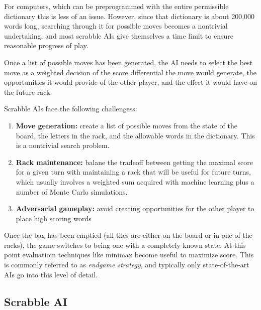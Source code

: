 \documentclass[12pt]{article}
\begin{document}
For computers, which can be preprogrammed with the entire permissible
dictionary this is less of an issue. However, since that dictionary is
about 200,000 words long, searching through it for possible moves
becomes a nontrivial undertaking, and most scrabble AIs give
themselves a time limit to ensure reasonable progress of play.

Once a list of possible moves has been generated, the AI needs to select
the best move as a weighted decision of the score differential the
move would generate, the opportunities it would provide of the other
player, and the effect it would have on the future rack.

Scrabble AIs face the following challengess:

\begin{enumerate}
  \item \textbf{Move generation:} create a list of possible moves from
    the state of the board, the letters in the rack, and the allowable
    words in the dictionary. This is a nontrivial search problem.
    
  \item \textbf{Rack maintenance:} balane the tradeoff between getting
    the maximal score for a given turn with maintaining a rack that
    will be useful for future turns, which usually involves a weighted
    sum acquired with machine learning plus a number of Monte Carlo
    simulations.
    
  \item \textbf{Adversarial gameplay:} avoid creating opportunities
    for the other player to place high scoring words 
\end{enumerate}

Once the bag has been emptied (all tiles are either on the board or in
one of the racks), the game switches to being one with a completely
known state. At this point evaluatioin techniques like minimax become
useful to maximize score. This is commonly referred to as
\emph{endgame strategy}, and typically only state-of-the-art AIs go
into this level of detail.

\subsection{Scrabble AI}
\end{document}
